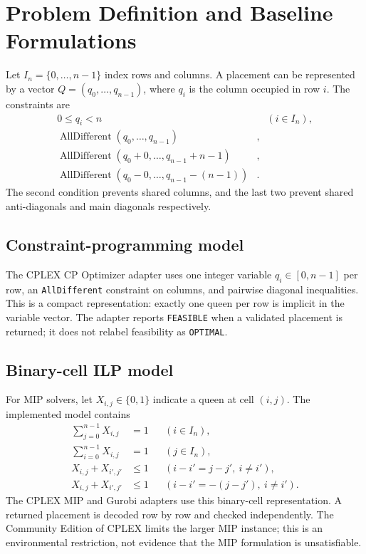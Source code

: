 \documentclass[a4paper,fleqn]{cas-sc}
\begin{document}
\section{Problem Definition and Baseline Formulations}

Let $I_n=\{0,\ldots,n-1\}$ index rows and columns. A placement can be
represented by a vector $Q=(q_0,\ldots,q_{n-1})$, where $q_i$ is the column
occupied in row $i$. The constraints are
\begin{align}
  0\le q_i<n &\quad (i\in I_n),\\
  \operatorname{AllDifferent}(q_0,\ldots,q_{n-1}) & ,\\
  \operatorname{AllDifferent}(q_0+0,\ldots,q_{n-1}+n-1) & ,\\
  \operatorname{AllDifferent}(q_0-0,\ldots,q_{n-1}-(n-1)) & .
\end{align}
The second condition prevents shared columns, and the last two prevent shared
anti-diagonals and main diagonals respectively.

\subsection{Constraint-programming model}
The CPLEX CP Optimizer adapter uses one integer variable $q_i\in[0,n-1]$
per row, an \texttt{AllDifferent} constraint on columns, and pairwise diagonal
inequalities. This is a compact representation: exactly one queen per row is
implicit in the variable vector. The adapter reports \texttt{FEASIBLE} when a
validated placement is returned; it does not relabel feasibility as
\texttt{OPTIMAL}.

\subsection{Binary-cell ILP model}
For MIP solvers, let $X_{i,j}\in\{0,1\}$ indicate a queen at cell $(i,j)$.
The implemented model contains
\begin{align}
  \sum_{j=0}^{n-1}X_{i,j}&=1 && (i\in I_n),\\
  \sum_{i=0}^{n-1}X_{i,j}&=1 && (j\in I_n),\\
  X_{i,j}+X_{i',j'}&\le 1 && (i-i'=j-j',\ i\ne i'),\\
  X_{i,j}+X_{i',j'}&\le 1 && (i-i'=-(j-j'),\ i\ne i').
\end{align}
The CPLEX MIP and Gurobi adapters use this binary-cell representation. A
returned placement is decoded row by row and checked independently. The
Community Edition of CPLEX limits the larger MIP instance; this is an
environmental restriction, not evidence that the MIP formulation is
unsatisfiable.
\end{document}

